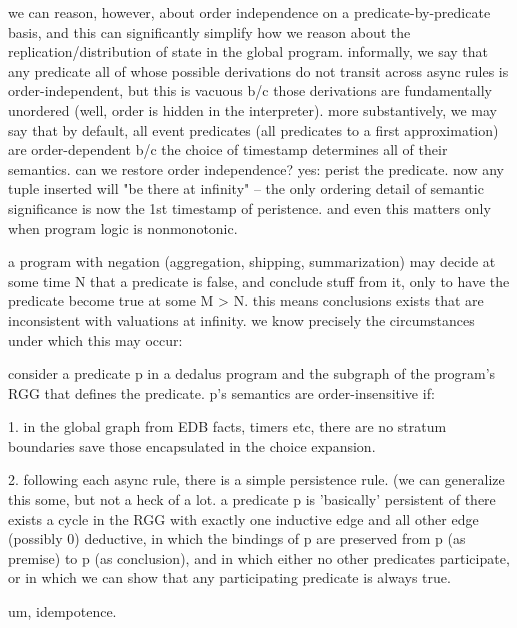 we can reason, however, about order independence on a predicate-by-predicate basis, and this
can significantly simplify how we reason about the replication/distribution of state in the
global program.  informally, we say that any predicate all of whose possible derivations 
do not transit across async rules is order-independent, but this is vacuous b/c those derivations
are fundamentally unordered (well, order is hidden in the interpreter).  more substantively,
we may say that by default, all event predicates (all predicates to a first approximation) 
are order-dependent b/c the choice of timestamp determines all of their semantics.  
can we restore order independence?  yes: perist the predicate.  now any tuple inserted will
"be there at infinity" -- the only ordering detail of semantic significance is now the 1st 
timestamp of peristence.  and even this matters only when program logic is nonmonotonic.

a program with negation (aggregation, shipping, summarization) may decide at some time N
that a predicate is false, and conclude stuff from it, only to have the predicate become
true at some M > N.  this means conclusions exists that are inconsistent with valuations at
infinity.  we know precisely the circumstances under which this may occur:

consider a predicate p in a dedalus program and the subgraph of the program's RGG that 
defines the predicate.  p's semantics are order-insensitive if:

1. in the global graph from EDB facts, timers etc, there are no stratum boundaries save those encapsulated in the choice expansion.

2. following each async rule, there is a simple persistence rule.  (we can generalize this some,
but not a heck of a lot.  a predicate p is 'basically' persistent of there exists a cycle in the RGG 
with exactly one inductive edge and all other edge (possibly 0) deductive, in which the 
bindings of p are preserved from p (as premise) to p (as conclusion), and in which either no other predicates participate, or in which we can show that any participating predicate is always true.




um, idempotence.

